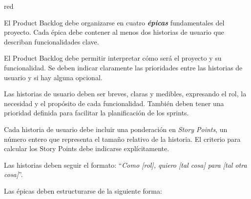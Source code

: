 \documentclass[
11pt, %
]{charter}
\begin{document}
\begin{consigna}{red} %

El Product Backlog debe organizarse en cuatro \textbf{\textit{\'{e}picas}} fundamentales del proyecto. Cada \'{e}pica debe contener al menos dos historias de usuario que describan funcionalidades clave.

El Product Backlog debe permitir interpretar cómo será el proyecto y su funcionalidad. Se deben indicar claramente las prioridades entre las historias de usuario y si hay alguna opcional.

Las historias de usuario deben ser breves, claras y medibles, expresando el rol, la necesidad y el propósito de cada funcionalidad. También deben tener una prioridad definida para facilitar la planificación de los sprints.

Cada historia de usuario debe incluir una ponderación en \textit{Story Points}, un número entero que representa el tama\~no relativo de la historia. El criterio para calcular los Story Points debe indicarse explícitamente.

Las historias deben seguir el formato: ``\textit{Como [rol], quiero [tal cosa] para [tal otra cosa]}''.

Las \'{e}picas deben estructurarse de la siguiente forma:


\end{consigna}
\end{document}
